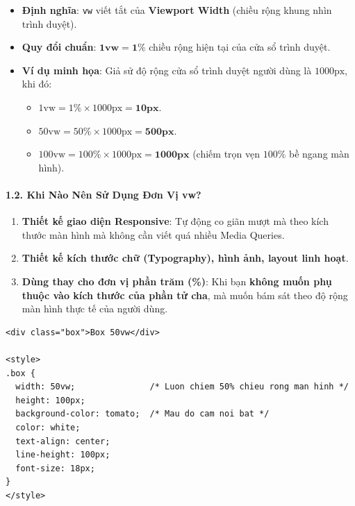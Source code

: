 \documentclass[11pt,oneside]{book}
\newcommand{\codeinline}[1]{\textcolor{accentOrange}{\texttt{#1}}}
\newcommand{\term}[1]{\textbf{\textcolor{primaryBlue}{#1}}}
\begin{document}
\begin{conceptBox}
\begin{itemize}[leftmargin=1.5em, itemsep=3pt, parsep=0pt]
    \item \textbf{Định nghĩa}: \codeinline{vw} viết tắt của \term{Viewport Width} (chiều rộng khung nhìn trình duyệt).
    \item \textbf{Quy đổi chuẩn}: $\mathbf{1\text{vw} = 1\%}$ chiều rộng hiện tại của cửa sổ trình duyệt.
    \item \textbf{Ví dụ minh họa}: Giả sử độ rộng cửa sổ trình duyệt người dùng là $1000\text{px}$, khi đó:
    \begin{itemize}[leftmargin=1.2em, itemsep=2pt]
        \item $1\text{vw} = 1\% \times 1000\text{px} = \mathbf{10\text{px}}$.
        \item $50\text{vw} = 50\% \times 1000\text{px} = \mathbf{500\text{px}}$.
        \item $100\text{vw} = 100\% \times 1000\text{px} = \mathbf{1000\text{px}}$ (chiếm trọn vẹn $100\%$ bề ngang màn hình).
    \end{itemize}
\end{itemize}
\end{conceptBox}

\paragraph{1.2. Khi Nào Nên Sử Dụng Đơn Vị vw?}
\begin{enumerate}[leftmargin=1.5em, itemsep=2pt, parsep=0pt]
    \item \textbf{Thiết kế giao diện Responsive}: Tự động co giãn mượt mà theo kích thước màn hình mà không cần viết quá nhiều Media Queries.
    \item \textbf{Thiết kế kích thước chữ (Typography), hình ảnh, layout linh hoạt}.
    \item \textbf{Dùng thay cho đơn vị phần trăm (\%)}: Khi bạn \textbf{không muốn phụ thuộc vào kích thước của phần tử cha}, mà muốn bám sát theo độ rộng màn hình thực tế của người dùng.
\end{enumerate}

\begin{codeWindow}
\begin{lstlisting}[language=HTML5]
<div class="box">Box 50vw</div>

<style>
.box {
  width: 50vw;               /* Luon chiem 50% chieu rong man hinh */
  height: 100px;
  background-color: tomato;  /* Mau do cam noi bat */
  color: white;
  text-align: center;
  line-height: 100px;
  font-size: 18px;
}
</style>
\end{lstlisting}
\end{codeWindow}
\end{document}
